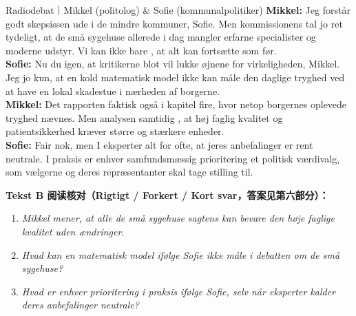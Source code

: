 \begin{emailbox}{Radiodebat｜Mikkel (politolog) \& Sofie (kommunalpolitiker)}
\textbf{Mikkel:} Jeg forstår godt skepsissen ude i de mindre kommuner, Sofie. Men kommissionens tal  jo ret tydeligt, at de små sygehuse allerede i dag mangler erfarne specialister og moderne udstyr. Vi kan ikke bare , at alt kan fortsætte som før.\\
\textbf{Sofie:} Nu  du igen, at kritikerne blot vil lukke øjnene for virkeligheden, Mikkel. Jeg  jo kun, at en kold matematisk model ikke kan måle den daglige tryghed ved at have en lokal skadestue i nærheden af borgerne.\\
\textbf{Mikkel:} Det  rapporten faktisk også i kapitel fire, hvor netop borgernes oplevede tryghed nævnes. Men analysen  samtidig , at høj faglig kvalitet og patientsikkerhed kræver større og stærkere enheder.\\
\textbf{Sofie:} Fair nok, men I eksperter  alt for ofte, at jeres anbefalinger er rent neutrale. I praksis er enhver samfundsmæssig prioritering et politisk værdivalg, som vælgerne og deres repræsentanter skal tage stilling til.
\end{emailbox}

\textbf{Tekst B 阅读核对（Rigtigt / Forkert / Kort svar，答案见第六部分）：}
\begin{enumerate}
  \item \textit{Mikkel mener, at alle de små sygehuse sagtens kan bevare den høje faglige kvalitet uden ændringer.} \underline{\hspace{2.2cm}}
  \item \textit{Hvad kan en matematisk model ifølge Sofie ikke måle i debatten om de små sygehuse?} \underline{\hspace{2.2cm}}
  \item \textit{Hvad er enhver prioritering i praksis ifølge Sofie, selv når eksperter kalder deres anbefalinger neutrale?} \underline{\hspace{2.2cm}}
\end{enumerate}

